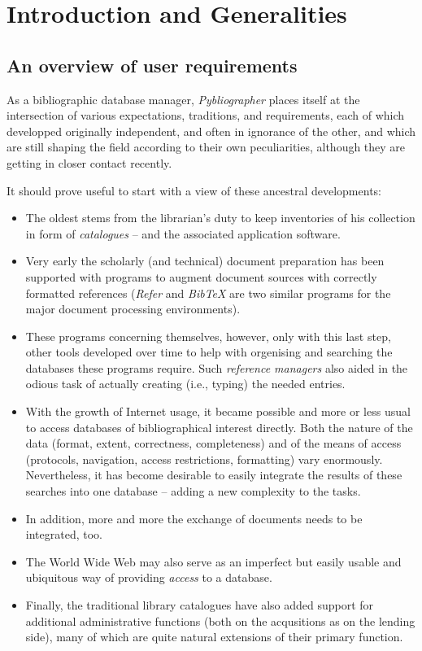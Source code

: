 \setcounter{secnumdepth}{3}
\cleardoublepage


\section{Introduction and Generalities}
\label{sec:intro}


\subsection{An overview of user requirements}
\label{sec:requ}

As a bibliographic database manager, \textit{Pybliographer} places
itself at the intersection of various expectations, traditions, and
requirements, each of which developped originally independent, and
often in ignorance of the other, and which are still shaping the field
according to their own peculiarities, although they are getting in
closer contact recently.

It should prove useful to start with a view of these ancestral
developments:

\begin{itemize}
\item The oldest stems from the librarian's duty to keep inventories
  of his collection in form of \textit{catalogues} -- and the
  associated application software.
\item Very early the scholarly (and technical) document preparation
  has been supported with programs to augment document sources with
  correctly formatted references (\textit{Refer} and \textit{BibTeX}
  are two similar programs for the major document processing
  environments).
\item These programs concerning themselves, however, only with this
  last step, other tools developed over time to help with orgenising
  and searching the databases these programs require. Such
  \textit{reference managers} also aided in the odious task of
  actually creating (i.e., typing) the needed entries.
\item With the growth of Internet usage, it became possible and more
  or less usual to access databases of bibliographical interest
  directly. Both the nature of the data (format, extent, correctness,
  completeness) and of the means of access (protocols, navigation,
  access restrictions, formatting)  vary enormously. Nevertheless, it
  has become desirable to easily integrate the results of these
  searches into one database -- adding a new complexity to the tasks.
\item In addition, more and more the exchange of documents needs to be
  integrated, too. 
\item The World Wide Web may also serve as an imperfect but easily usable
  and ubiquitous way of providing \textit{access} to a database.
\item Finally, the traditional library catalogues have also added
  support for additional administrative functions (both on the
  acqusitions as on the lending side), many of which are quite
  natural extensions of their primary function.
\end{itemize}

